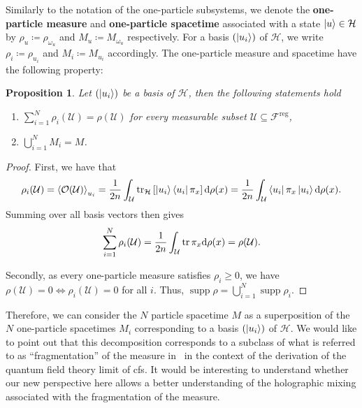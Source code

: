 \documentclass[reqno,11pt]{amsart}
\DeclareMathOperator{\supp}{supp}
\newcommand{\defeq}{\coloneqq}
\renewcommand{\H}{\mathcal{H}}
\newcommand{\F}{{\mathcal{F}}}
\newtheorem{proposition}[definition]{Proposition}
\numberwithin{equation}{section}
\begin{document}
Similarly to the notation of the one-particle subsystems, we denote the \textbf{one-particle measure} and \textbf{one-particle spacetime}
associated with a state $\ket{u} \in \H$ by $\rho_{u} \defeq \rho_{\omega_u}$ and $M_u \defeq M_{\omega_u}$ respectively.
For a basis $\left( \ket{u_i} \right)$ of $\H$, we write $\rho_i \defeq \rho_{u_i}$ and $M_i \defeq M_{u_i}$ accordingly.
The one-particle measure and spacetime have the following property:

\begin{proposition}\label{prop:superposition}
    Let $\left( \ket{u_i} \right)$ be a basis of $\H$, then the following statements hold
    \begin{enumerate}
        \item $\displaystyle \sum_{i = 1}^{N} \rho_i(\mathcal{U}) = \rho(\mathcal{U})$ for every measurable subset $\mathcal{U} \subseteq \F^{\text{reg}}$,
        \item $\displaystyle \bigcup_{i = 1}^N M_i = M$.
    \end{enumerate}
\end{proposition}

\begin{proof}
    First, we have that
    \begin{align*}
        \rho_i(\mathcal{U}) = \expval{\mathcal{O}(\mathcal{U})}_{u_i} = \frac{1}{2n} \int_{\mathcal{U}} \tr_\H \left[ \ket{u_i} \bra{u_i} \pi_x \right] \dd \rho(x) = \frac{1}{2n} \int_{\mathcal{U}} \bra{u_i} \pi_x \ket{u_i} \dd \rho(x).
    \end{align*}
    Summing over all basis vectors then gives
    \begin{align*}
        \sum_{i = 1}^{N} \rho_i(\mathcal{U}) = \frac{1}{2n} \int_{\mathcal{U}} \tr \pi_x \dd \rho(x) = \rho(\mathcal{U}).
    \end{align*}

    Secondly, as every one-particle measure satisfies $\rho_i \geq 0$, we have $\rho(\mathcal{U}) = 0 \Leftrightarrow \rho_i(\mathcal{U}) = 0$ for all $i$.
    Thus, $\supp \rho = \bigcup_{i = 1}^N \supp \rho_i$.
\end{proof}

Therefore, we can consider the $N$ particle spacetime $M$ as a superposition of the $N$ one-particle spacetimes $M_i$
corresponding to a basis $\left( \ket{u_i} \right)$ of $\H$. We would like to point out that this decomposition corresponds to a subclass of what is referred to as   ``fragmentation'' of the measure in~\cite{finster2019positive,dappiaggi2024holographic} in the context of the derivation of the quantum field theory limit of \ac{cfs}. It would be interesting to understand whether our new perspective here allows a better understanding of the holographic mixing associated with the fragmentation of the measure. 
\end{document}
